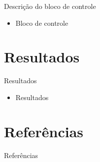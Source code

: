 \documentclass[11pt]{beamer}
\begin{document}
\begin{frame}{Descrição do bloco de controle}
	\begin{itemize}
	\item Bloco de controle
	\end{itemize}
\end{frame}

\section{Resultados}
\begin{frame}{Resultados}

\begin{itemize}
	\item Resultados
\end{itemize}

\end{frame}

\section{Referências}
\begin{frame}{Referências}
  
	{}
	

\end{frame}
\end{document}
